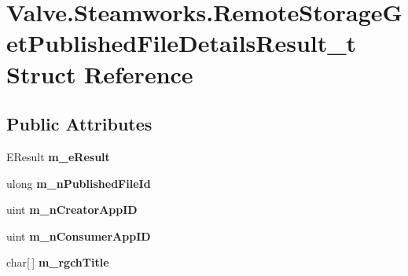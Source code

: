 \hypertarget{structValve_1_1Steamworks_1_1RemoteStorageGetPublishedFileDetailsResult__t}{}\section{Valve.\+Steamworks.\+Remote\+Storage\+Get\+Published\+File\+Details\+Result\+\_\+t Struct Reference}
\label{structValve_1_1Steamworks_1_1RemoteStorageGetPublishedFileDetailsResult__t}
\subsection*{Public Attributes}
\begin{DoxyCompactItemize}
\item 
\hypertarget{structValve_1_1Steamworks_1_1RemoteStorageGetPublishedFileDetailsResult__t_af813c4319a6569c55b8e7a731a52433f}{}E\+Result {\bfseries m\+\_\+e\+Result}\label{structValve_1_1Steamworks_1_1RemoteStorageGetPublishedFileDetailsResult__t_af813c4319a6569c55b8e7a731a52433f}

\item 
\hypertarget{structValve_1_1Steamworks_1_1RemoteStorageGetPublishedFileDetailsResult__t_a6a4dd7187cdeed0f0b35420a77fb6925}{}ulong {\bfseries m\+\_\+n\+Published\+File\+Id}\label{structValve_1_1Steamworks_1_1RemoteStorageGetPublishedFileDetailsResult__t_a6a4dd7187cdeed0f0b35420a77fb6925}

\item 
\hypertarget{structValve_1_1Steamworks_1_1RemoteStorageGetPublishedFileDetailsResult__t_a1af88c390a588b37a8c66b0f724f97b1}{}uint {\bfseries m\+\_\+n\+Creator\+App\+I\+D}\label{structValve_1_1Steamworks_1_1RemoteStorageGetPublishedFileDetailsResult__t_a1af88c390a588b37a8c66b0f724f97b1}

\item 
\hypertarget{structValve_1_1Steamworks_1_1RemoteStorageGetPublishedFileDetailsResult__t_afd59d613175fff7399e25e02f4138bed}{}uint {\bfseries m\+\_\+n\+Consumer\+App\+I\+D}\label{structValve_1_1Steamworks_1_1RemoteStorageGetPublishedFileDetailsResult__t_afd59d613175fff7399e25e02f4138bed}

\item 
\hypertarget{structValve_1_1Steamworks_1_1RemoteStorageGetPublishedFileDetailsResult__t_ad1d16c5daf552e408d295d880c63c42c}{}char\mbox{[}$\,$\mbox{]} {\bfseries m\+\_\+rgch\+Title}\label{structValve_1_1Steamworks_1_1RemoteStorageGetPublishedFileDetailsResult__t_ad1d16c5daf552e408d295d880c63c42c}


\end{DoxyCompactItemize}
